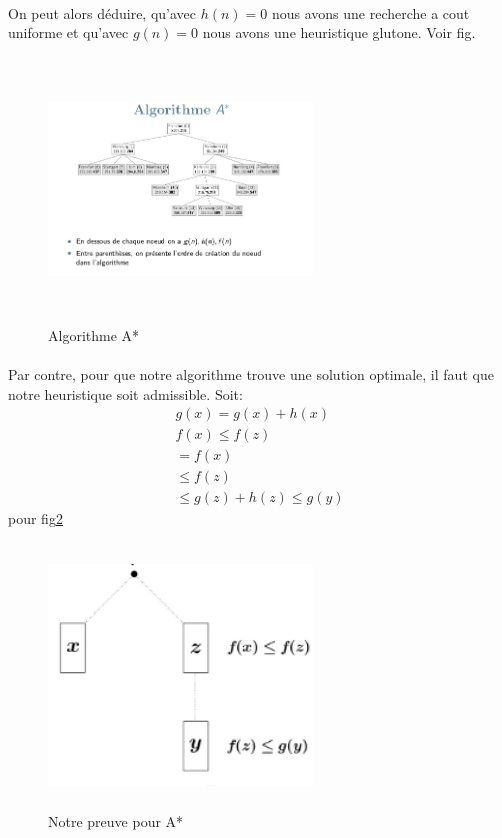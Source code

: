 \documentclass{book}
\begin{document}
\paragraph{}
On peut alors déduire, qu'avec $h(n) = 0$ nous avons une recherche a cout uniforme et qu'avec $g(n) = 0$ nous avons une heuristique glutone. Voir fig.

\begin{figure}[!ht]
	\centering
	\includegraphics[width = 7cm, height = 7cm, keepaspectratio]{A*.png}
	\caption{Algorithme A*}
	\label{fig:A*}
\end{figure}
\paragraph{}
Par contre, pour que notre algorithme trouve une solution optimale, il faut que notre heuristique soit admissible. Soit:
\begin{align*}
g(x) = g(x) + h(x) \\
f(x) \leq f(z) \\
= f(x)\\
\leq f(z) \\
\leq g(z) + h(z) \leq g(y)
\end{align*}
pour fig\ref{fig:Preuve_A*}
\begin{figure}[!ht]
\centering
\includegraphics[width = 7cm, height = 7cm, keepaspectratio]{Preuve_A*.png}
\caption{Notre preuve pour A*}
\label{fig:Preuve_A*}
\end{figure}
\end{document}
